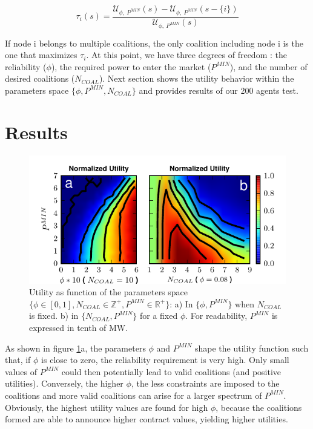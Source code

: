 \documentclass[conference]{IEEEtran}
\begin{document}
\begin{equation}
\tau_{i}(s) = \dfrac{\mathcal{U}_{\phi,\ P^{MIN}}(s) - \mathcal{U}_{\phi,\ P^{MIN}}(s-\{i\}) }{\mathcal{U}_{\phi,\ P^{MIN}}(s)}
\label{tau}
\end{equation}

If node i belongs to  multiple coalitions, the only coalition including node i is the one that maximizes $ \tau_{i} $. At this point, we have three degrees of freedom : the reliability ($ \phi $), the required power to enter the market ($P^{MIN}$), and the number of desired coalitions ($ N_{COAL} $). Next section shows the utility behavior within the parameters space $ \{\phi,P^{MIN},N_{COAL} \} $ and provides results of our 200 agents test.

\section{Results}
\label{sec:results}

\begin{figure}
 \centering
  \includegraphics[scale=0.75]{./figure9/util}
\caption{Utility as function of the parameters space $\{\phi \in [0,1], N_{COAL}\in \mathbb{Z}^+, P^{MIN} \in \mathbb{R}^+\}$: a) In $ \{\phi, P^{MIN}\} $ when $ N_{COAL} $ is fixed. b) in $ \{N_{COAL}, P^{MIN}\} $ for a fixed $ \phi $. For readability, $ P^{MIN} $ is expressed in tenth of MW.}
\label{Fig2}
\end{figure}

As shown in figure \ref{Fig2}a, the parameters $\phi$ and $P^{MIN}$ shape the utility function such that, if $ \phi $ is close to zero, the reliability requirement is very high. Only small values of $ P^{MIN}$ could then potentially lead to valid coalitions (and positive utilities). Conversely, the higher $\phi$, the less constraints are imposed to the coalitions and more valid coalitions can arise for a larger spectrum of $ P^{MIN}$. Obviously, the highest utility values are found for high $ \phi $, because the coalitions formed are able to announce higher contract values, yielding higher utilities. 
\end{document}
